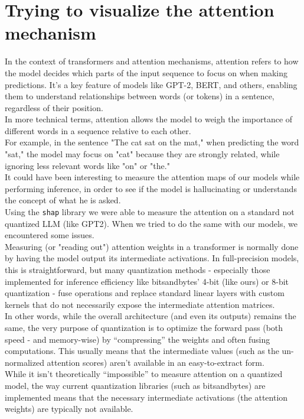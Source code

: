 \documentclass[12pt]{article}
\begin{document}
\section{Trying to visualize the attention mechanism}
In the context of transformers and attention mechanisms, attention refers to how the model decides which parts of the input sequence to focus on when making predictions. It's a key feature of models like GPT-2, BERT, and others, enabling them to understand relationships between words (or tokens) in a sentence, regardless of their position.\\
In more technical terms, attention allows the model to weigh the importance of different words in a sequence relative to each other.\\
For example, in the sentence "The cat sat on the mat," when predicting the word "sat," the model may focus on "cat" because they are strongly related, while ignoring less relevant words like "on" or "the."\vspace{14pt}\\
It could have been interesting to measure the attention maps of our models while performing inference, in order to see if the model is hallucinating or understands the concept of what he is asked.\\
Using the \texttt{shap} library we were able to measure the attention on a standard not quantized LLM (like GPT2). When we tried to do the same with our models, we encountered some issues.\vspace{14pt}\\
Measuring (or "reading out") attention weights in a transformer is normally done by having the model output its intermediate activations. In full-precision models, this is straightforward, but many quantization methods - especially those implemented for inference efficiency like bitsandbytes' 4-bit (like ours) or 8-bit quantization - fuse operations and replace standard linear layers with custom kernels that do not necessarily expose the intermediate attention matrices.\vspace{14pt}\\
In other words, while the overall architecture (and even its outputs) remains the same, the very purpose of quantization is to optimize the forward pass (both speed - and memory-wise) by ``compressing'' the weights and often fusing computations. This usually means that the intermediate values (such as the un-normalized attention scores) aren’t available in an easy-to-extract form.\\
While it isn’t theoretically ``impossible'' to measure attention on a quantized model, the way current quantization libraries (such as bitsandbytes) are implemented means that the necessary intermediate activations (the attention weights) are typically not available. 
\end{document}
